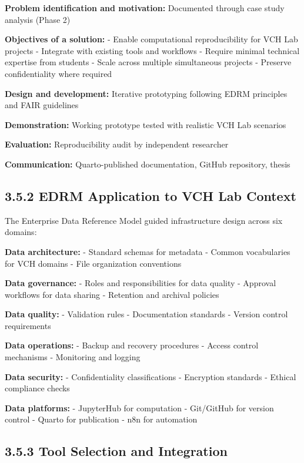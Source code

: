 \documentclass[
  oneside,
  open=any]{scrbook}
\begin{document}
\textbf{Problem identification and motivation:} Documented through case
study analysis (Phase 2)

\textbf{Objectives of a solution:} - Enable computational
reproducibility for VCH Lab projects - Integrate with existing tools and
workflows - Require minimal technical expertise from students - Scale
across multiple simultaneous projects - Preserve confidentiality where
required

\textbf{Design and development:} Iterative prototyping following EDRM
principles and FAIR guidelines

\textbf{Demonstration:} Working prototype tested with realistic VCH Lab
scenarios

\textbf{Evaluation:} Reproducibility audit by independent researcher

\textbf{Communication:} Quarto-published documentation, GitHub
repository, thesis

\subsection{3.5.2 EDRM Application to VCH Lab
Context}\label{edrm-application-to-vch-lab-context}

The Enterprise Data Reference Model guided infrastructure design across
six domains:

\textbf{Data architecture:} - Standard schemas for metadata - Common
vocabularies for VCH domains - File organization conventions

\textbf{Data governance:} - Roles and responsibilities for data quality
- Approval workflows for data sharing - Retention and archival policies

\textbf{Data quality:} - Validation rules - Documentation standards -
Version control requirements

\textbf{Data operations:} - Backup and recovery procedures - Access
control mechanisms - Monitoring and logging

\textbf{Data security:} - Confidentiality classifications - Encryption
standards - Ethical compliance checks

\textbf{Data platforms:} - JupyterHub for computation - Git/GitHub for
version control - Quarto for publication - n8n for automation

\subsection{3.5.3 Tool Selection and
Integration}\label{tool-selection-and-integration}
\end{document}
